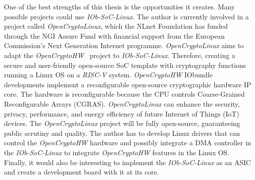 One of the best strengths of this thesis is the opportunities it creates. Many possible projects could use \textit{IOb-SoC-Linux}. The author is currently involved in a project called \textit{OpenCryptoLinux}, which the NLnet Foundation has funded through the NGI Assure Fund with financial support from the European Commission's Next Generation Internet programme. \textit{OpenCryptoLinux} aims to adapt the \textit{OpenCryptoHW}~\cite{open_crypto_hw} project to \textit{IOb-SoC-Linux}. Therefore, creating a secure and user-friendly open-source SoC template with cryptography functions running a Linux OS on a \textit{RISC-V} system. \textit{OpenCryptoHW} IObundle developments implement a reconfigurable open-source cryptographic hardware IP core. The hardware is reconfigurable because the CPU controls Coarse-Grained Reconfigurable Arrays (CGRAS). \textit{OpenCryptoLinux} can enhance the security, privacy, performance, and energy efficiency of future Internet of Things (IoT) devices. The \textit{OpenCryptoLinux} project will be fully open-source, guaranteeing public scrutiny and quality. The author has to develop Linux drivers that can control the \textit{OpenCryptoHW} hardware and possibly integrate a DMA controller in the \textit{IOb-SoC-Linux} to integrate \textit{OpenCryptoHW} features in the Linux OS. Finally, it would also be interesting to implement the \textit{IOb-SoC-Linux} as an ASIC and create a development board with it at its core.
